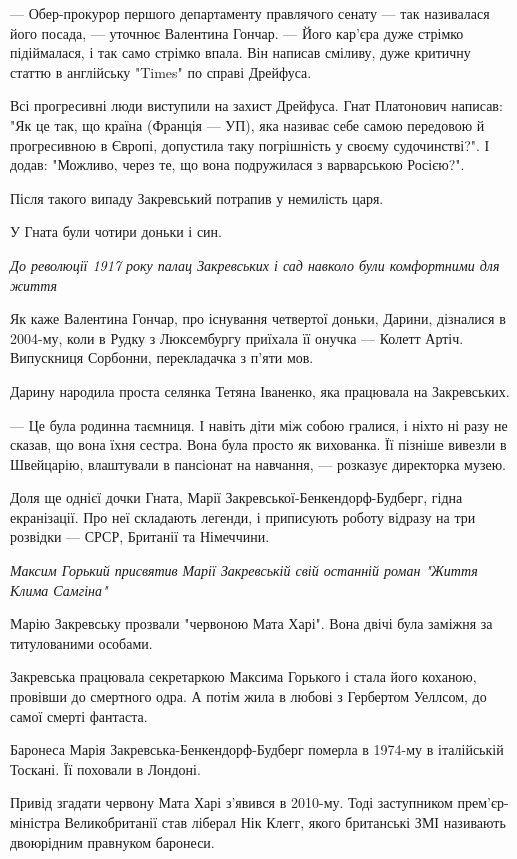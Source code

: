 \documentclass[a4paper,11pt]{extreport}
\begin{document}
--- Обер-прокурор першого департаменту правлячого сенату --- так називалася його
посада, --- уточнює Валентина Гончар. --- Його кар'єра дуже стрімко підіймалася, і
так само стрімко впала. Він написав сміливу, дуже критичну статтю в англійську
"Times" по справі Дрейфуса. 

Всі прогресивні люди виступили на захист Дрейфуса. Гнат Платонович написав: "Як
це так, що країна (Франція --- УП), яка називає себе самою передовою й
прогресивною в Європі, допустила таку погрішність у своєму судочинстві?". І
додав: "Можливо, через те, що вона подружилася з варварською Росією?".

Після такого випаду Закревський потрапив у немилість царя.

У Гната були чотири доньки і син. 

\emph{До революції 1917 року палац Закревських і сад навколо були комфортними для життя}

Як каже Валентина Гончар, про існування четвертої доньки, Дарини, дізналися в
2004-му, коли в Рудку з Люксембургу приїхала її онучка --- Колетт Артіч.
Випускниця Сорбонни, перекладачка з п'яти мов.

Дарину народила проста селянка Тетяна Іваненко, яка працювала на Закревських.

--- Це була родинна таємниця. І навіть діти між собою гралися, і ніхто ні разу не
сказав, що вона їхня сестра. Вона була просто як вихованка. Її пізніше вивезли
в Швейцарію, влаштували в пансіонат на навчання, --- розказує директорка музею.

Доля ще однієї дочки Гната, Марії Закревської-Бенкендорф-Будберг, гідна
екранізації. Про неї складають легенди, і приписують роботу відразу на три
розвідки --- СРСР, Британії та Німеччини.

\emph{Максим Горький присвятив Марії Закревській свій останній роман "Життя Клима Самгіна"}

Марію Закревську прозвали "червоною Мата Харі". Вона двічі була заміжня за титулованими особами.

Закревська працювала секретаркою Максима Горького і стала його коханою,
провівши до смертного одра. А потім жила в любові з Гербертом Уеллсом, до самої
смерті фантаста.

Баронеса Марія Закревська-Бенкендорф-Будберг померла в 1974-му в італійській
Тоскані. Її поховали в Лондоні.

Привід згадати червону Мата Харі з'явився в 2010-му. Тоді заступником
прем'єр-міністра Великобританії став ліберал Нік Клегг, якого британські ЗМІ
називають двоюрідним правнуком баронеси.
\end{document}
